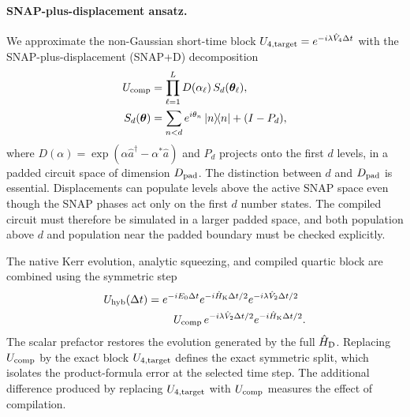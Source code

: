 \documentclass[pra,twocolumn,superscriptaddress,nofootinbib,floatfix]{revtex4-2}
\theoremstyle{remark}
\newcommand{\revcolor}{\color{blue}}
\DeclareRobustCommand{\rev}[1]{{\revcolor #1}}
\begin{document}
\paragraph{SNAP-plus-displacement ansatz.}
\rev{We approximate the non-Gaussian short-time block $U_{4,\rm target} = e^{-i\lambda\hat V_4\Delta t}$ with the SNAP-plus-displacement (SNAP+D) decomposition \cite{Krastanov_2015,Fosel2020SNAP,Kudra2022SNAPD}}
\begingroup\revcolor
\begin{align}
U_{\rm comp}&=\prod_{\ell=1}^{L}D(\alpha_\ell)\,S_d(\boldsymbol\theta_\ell),\nonumber\\
S_d(\boldsymbol\theta)&=\sum_{n<d}e^{i\theta_n}\ketbra{n}{n}+(I-P_d),
\label{eq:snapd-ansatz}
\end{align}
\endgroup
\rev{where \(D(\alpha)=\exp(\alpha\hat a^\dagger-\alpha^*\hat a)\) and \(P_d\) projects onto the first \(d\) levels, in a padded circuit space of dimension \(D_{\rm pad}\).} The distinction between \(d\) and \(D_{\rm pad}\) is essential. Displacements can populate levels above the active SNAP space even though the SNAP phases act only on the first \(d\) number states. The compiled circuit must therefore be simulated in a larger padded space, and both population above \(d\) and population near the padded boundary must be checked explicitly.

\rev{The native Kerr evolution, analytic squeezing, and compiled quartic block are combined using the symmetric step \cite{Strang1968}}
\begin{align}
U_{\rm hyb}(\Delta t) ={}& e^{-iE_0\Delta t}e^{-i\hat H_{\rm K}\Delta t/2}e^{-i\lambda\hat V_2\Delta t/2}\nonumber\\
&\quad U_{\rm comp}\,e^{-i\lambda\hat V_2\Delta t/2}e^{-i\hat H_{\rm K}\Delta t/2}.
\label{eq:df-hybrid-step}
\end{align}
The scalar prefactor restores the evolution generated by the full \(\hat H_{\rm D}\). \rev{Replacing \(U_{\rm comp}\) by the exact block \(U_{4,\rm target}\) defines the exact symmetric split, which isolates the product-formula error at the selected time step.} \rev{The additional difference produced by replacing \(U_{4,\rm target}\) with \(U_{\rm comp}\) measures the effect of compilation.}
\end{document}
